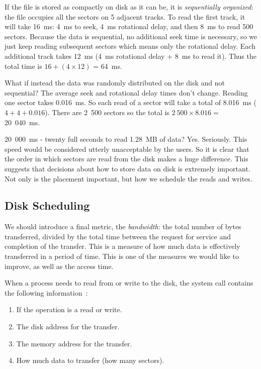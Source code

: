 If the file is stored as compactly on disk as it can be, it is \textit{sequentially organized}: the file occupies all the sectors on 5 adjacent tracks. To read the first track, it will take 16~ms: 4~ms to seek, 4~ms rotational delay, and then 8~ms to read 500 sectors. Because the data is sequential, no additional seek time is necessary, so we just keep reading subsequent sectors which means only the rotational delay. Each additional track takes 12~ms (4~ms rotational delay + 8~ms to read it). Thus the total time is $16 + (4 \times 12)$ = 64~ms.

What if instead the data was randomly distributed on the disk and not sequential? The average seek and rotational delay times don't change. Reading one sector takes 0.016~ms. So each read of a sector will take a total of 8.016~ms ($4 + 4 + 0.016$). There are 2~500 sectors so the total is $2~500 \times 8.016 =$ 20~040~ms. 

20~000~ms - twenty full seconds to read 1.28~MB of data? Yes. Seriously. This speed would be considered utterly unacceptable by the users. So it is clear that the order in which sectors are read from the disk makes a huge difference. This suggests that decisions about how to store data on disk is extremely important. Not only is the placement important, but how we schedule the reads and writes.

\subsection*{Disk Scheduling}
We should introduce a final metric, the \textit{bandwidth}: the total number of bytes transferred, divided by the total time between the request for service and completion of the transfer. This is a measure of how much data is effectively transferred in a period of time. This is one of the measures we would like to improve, as well as the access time.

When a process needs to read from or write to the disk, the system call contains the following information~\cite{osc}:

\begin{enumerate}
	\item If the operation is a read or write.
	\item The disk address for the transfer.
	\item The memory address for the transfer.
	\item How much data to transfer (how many sectors).
\end{enumerate}

